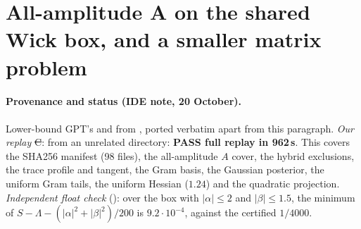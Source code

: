 \section{All-amplitude A on the shared Wick box, and a smaller matrix problem}
\label{ch:all-a-matrix}

\paragraph{Provenance and status (IDE note, 20 October).} Lower-bound GPT's  and  from
, ported verbatim apart from this paragraph. \emph{Our replay} \st{C}:  from an unrelated directory:
\textbf{PASS full replay in 962\,s}. This covers the SHA256 manifest (98 files), the all-amplitude $A$ cover, the hybrid exclusions, the trace profile and tangent, the Gram basis, the
Gaussian posterior, the uniform Gram tails, the uniform Hessian ($1.24$) and the quadratic projection. \emph{Independent float check} (): over the box with
$|\alpha|\le2$ and $|\beta|\le1.5$, the minimum of $S-\Lambda-(|\alpha|^2+|\beta|^2)/200$ is $9.2\cdot10^{-4}$, against the certified $1/4000$.


